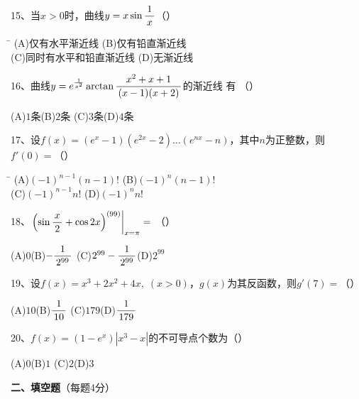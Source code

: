 \bigskip

15、当$x>0$时，曲线$y=x\sin\displaystyle\frac{\,{1}\,}{\,{x}\,}$（\quad）%
\begin{tabbing}
	\hspace{8cm}\=\kill
	\quad\quad\quad(A)\;仅有水平渐近线 \> 
	(B)\;仅有铅直渐近线 \\ 
	\quad\quad\quad(C)\;同时有水平和铅直渐近线\>
	(D)\;无渐近线
\end{tabbing}

\bigskip

16、曲线$y=e^{\frac1{x^2}}\arctan\displaystyle\frac{\,{x^2+x+1}\,}{\,{(x-1)(x+2)}\,}$的渐近线
有
（\quad）%

\quad (A)\;$1$条\quad\quad\quad(B)\;$2$条
\quad\quad\quad (C)\;$3$条\quad\quad\quad(D)\;$4$条

\bigskip

17、设$f(x)=(e^x-1)(e^{2x}-2)\ldots(e^{nx}-n)$，其中$n$为正整数，则
$f'(0)=$（\quad）%
\begin{tabbing}
	\hspace{8cm}\=\kill
	\quad\quad\quad(A)\;$(-1)^{n-1}(n-1)!$ \> 
	(B)\;$(-1)^{n}(n-1)!$ \\ 
	\quad\quad\quad(C)\;$(-1)^{n-1}n!$\>
	(D)\;$(-1)^{n}n!$
\end{tabbing}

\bigskip

18、$\left.\left(\sin\displaystyle\frac{\,{x}\,}{\,{2}\,}+\cos2x\right)^{(99)}\right|_{x=\pi}=$
（\quad）%

\quad (A)\;$0$\quad\quad\quad(B)\;$-\displaystyle\frac{\,{1}\,}{\,{2^{99}}\,}$
\quad\quad\quad (C)\;$2^{99}-\displaystyle\frac{\,{1}\,}{\,{2^{99}}\,}$\quad\quad\quad(D)\;$2^{99}$

\bigskip

19、设$f(x)=x^3+2x^2+4x,\;(x>0)$，$g(x)$为其反函数，则$g'(7)=$（\quad）%

\quad (A)\;$10$\quad\quad\quad(B)\;$\displaystyle\frac{\,{1}\,}{\,{10}\,}$
\quad\quad\quad (C)\;$179$\quad\quad\quad(D)\;$\displaystyle\frac{\,{1}\,}{\,{179}\,}$

\bigskip

20、$f(x)=(1-e^x)|x^3-x|$的不可导点个数为（\quad）%

\quad (A)\;$0$\quad\quad\quad(B)\;$1$
\quad\quad\quad (C)\;$2$\quad\quad\quad(D)\;$3$

\bigskip

{\bf 二、填空题}（每题4分）

\bigskip



